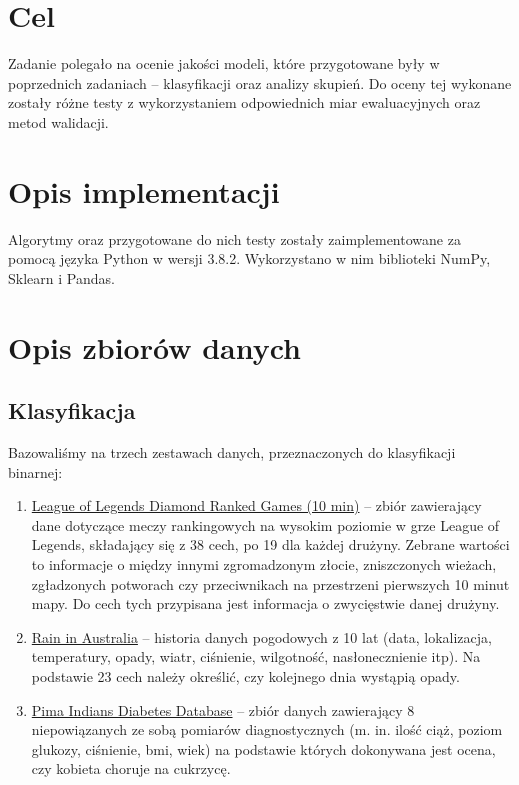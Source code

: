 \documentclass[a4paper,11pt]{article}
\begin{document}
\setcounter{page}{2}
\tableofcontents
\newpage
{}


\section{Cel} \label{sec:cel}
Zadanie polegało na ocenie jakości modeli, które przygotowane były w poprzednich zadaniach -- klasyfikacji oraz analizy skupień. Do oceny tej wykonane zostały różne testy z wykorzystaniem odpowiednich miar ewaluacyjnych oraz metod walidacji.


\section{Opis implementacji}
Algorytmy oraz przygotowane do nich testy zostały zaimplementowane za pomocą języka Python w wersji 3.8.2.
Wykorzystano w nim biblioteki NumPy, Sklearn i Pandas. 


\section{Opis zbiorów danych} \label{sec:dataset}

\subsection{Klasyfikacja}

Bazowaliśmy na trzech zestawach danych, przeznaczonych do klasyfikacji binarnej: 

\begin{enumerate}[label=\Alph*.] \label{zbiory_klasyfikacja}
    \item{\href{https://www.kaggle.com/bobbyscience/league-of-legends-diamond-ranked-games-10-min}{League of Legends Diamond Ranked Games (10 min)}} -- zbiór zawierający dane dotyczące meczy rankingowych na wysokim poziomie w grze League of Legends, składający się z 38 cech, po 19 dla każdej drużyny. Zebrane wartości to informacje o między innymi zgromadzonym złocie, zniszczonych wieżach, zgładzonych potworach czy przeciwnikach na przestrzeni pierwszych 10 minut mapy. Do cech tych przypisana jest informacja o zwycięstwie danej drużyny. 
    \item{\href{https://www.kaggle.com/jsphyg/weather-dataset-rattle-package}{Rain in Australia}} -- historia danych pogodowych z 10 lat (data, lokalizacja, temperatury, opady, wiatr, ciśnienie, wilgotność, nasłonecznienie itp). Na podstawie 23 cech należy określić, czy kolejnego dnia wystąpią opady.
    \item{\href{https://www.kaggle.com/uciml/pima-indians-diabetes-database}{Pima Indians Diabetes Database}} -- zbiór danych zawierający 8 niepowiązanych ze sobą pomiarów diagnostycznych (m. in. ilość ciąż, poziom glukozy, ciśnienie, bmi, wiek) na podstawie których dokonywana jest ocena, czy kobieta choruje na cukrzycę.
\end{enumerate}
\end{document}
